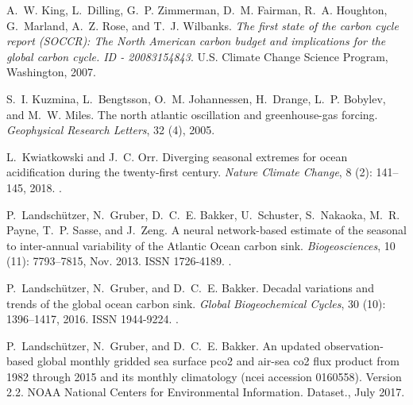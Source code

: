 \documentclass[hvmath, online,bgd]{copernicus_discussions}
\begin{document}
\begin{thebibliography}{84}
	A.~W. King, L.~Dilling, G.~P. Zimmerman, D.~M. Fairman, R.~A. Houghton,
	G.~Marland, A.~Z. Rose, and T.~J. Wilbanks.
	\newblock \emph{The first state of the carbon cycle report (SOCCR): The North
		American carbon budget and implications for the global carbon cycle. ID -
		20083154843}.
	\newblock U.S. Climate Change Science Program, Washington, 2007.
	
	S.~I. Kuzmina, L.~Bengtsson, O.~M. Johannessen, H.~Drange, L.~P. Bobylev, and
	M.~W. Miles.
	\newblock The north atlantic oscillation and greenhouse-gas forcing.
	\newblock \emph{Geophysical Research Letters}, 32 (4), 2005.
	
	L.~Kwiatkowski and J.~C. Orr.
	\newblock Diverging seasonal extremes for ocean acidification during the
	twenty-first century.
	\newblock \emph{Nature Climate Change}, 8 (2): 141--145,
	2018.
	\newblock {}.
	
	P.~Landsch{\"u}tzer, N.~Gruber, D.~C.~E. Bakker, U.~Schuster, S.~Nakaoka, M.~R.
	Payne, T.~P. Sasse, and J.~Zeng.
	\newblock A neural network-based estimate of the seasonal to inter-annual
	variability of the {Atlantic} {Ocean} carbon sink.
	\newblock \emph{Biogeosciences}, 10 (11): 7793--7815, Nov.
	2013.
	\newblock ISSN 1726-4189.
	\newblock {}.
	
	P.~Landsch{\"u}tzer, N.~Gruber, and D.~C.~E. Bakker.
	\newblock Decadal variations and trends of the global ocean carbon sink.
	\newblock \emph{Global Biogeochemical Cycles}, 30 (10):
	1396--1417, 2016.
	\newblock ISSN 1944-9224.
	\newblock {}.
	
	P.~Landsch{\"u}tzer, N.~Gruber, and D.~C.~E. Bakker.
	\newblock An updated observation-based global monthly gridded sea surface pco2
	and air-sea co2 flux product from 1982 through 2015 and its monthly
	climatology (ncei accession 0160558).
	\newblock Version 2.2. NOAA National Centers for Environmental Information.
	Dataset., July 2017.
	

\end{thebibliography}
\end{document}
